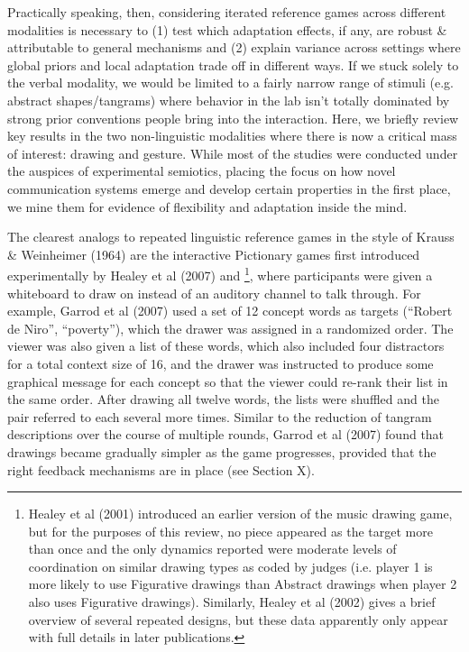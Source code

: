 \documentclass[11pt, floatsintext, jou]{apa6}
\begin{document}
Practically speaking, then, considering iterated reference games across different modalities is necessary to (1) test which adaptation effects, if any, are robust \& attributable to general mechanisms and (2) explain variance across settings where global priors and local adaptation trade off in different ways. If we stuck solely to the verbal modality, we would be limited to a fairly narrow range of stimuli (e.g. abstract shapes/tangrams) where behavior in the lab isn't totally dominated by strong prior conventions people bring into the interaction. Here, we briefly review key results in the two non-linguistic modalities where there is now a critical mass of interest: drawing and gesture. While most of the studies were conducted under the auspices of experimental semiotics, placing the focus on how novel communication systems emerge and develop certain properties in the first place, we mine them for evidence of flexibility and adaptation inside the mind. 

The clearest analogs to repeated linguistic reference games in the style of Krauss \& Weinheimer (1964) are the interactive Pictionary games first introduced experimentally by Healey et al (2007) and 
\footnote{Healey et al (2001) introduced an earlier version of the music drawing game, but for the purposes of this review, no piece appeared as the target more than once and the only dynamics reported were moderate levels of coordination on similar drawing types as coded by judges (i.e. player 1 is more likely to use Figurative drawings than Abstract drawings when player 2 also uses Figurative drawings). Similarly, Healey et al (2002) gives a brief overview of several repeated designs, but these data apparently only appear with full details in later publications.
}, 
where participants were given a whiteboard to draw on instead of an auditory channel to talk through. For example, Garrod et al (2007) used a set of 12 concept words as targets (``Robert de Niro'', ``poverty''), which the drawer was assigned in a randomized order. The viewer was also given a list of these words, which also included four distractors for a total context size of 16, and the drawer was instructed to produce some graphical message for each concept so that the viewer could re-rank their list in the same order. After drawing all twelve words, the lists were shuffled and the pair referred to each several more times. Similar to the reduction of tangram descriptions over the course of multiple rounds, Garrod et al (2007) found that drawings became gradually simpler as the game progresses, provided that the right feedback mechanisms are in place (see Section X). 
\end{document}
